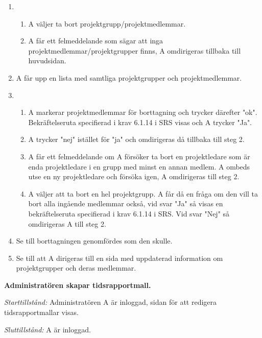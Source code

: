 \documentclass[a4paper]{article}
\begin{document}
\begin{ST}
\begin{enumerate}
\item 
\begin{enumerate}
\item A väljer ta bort projektgrupp/projektmedlemmar.
\item A får ett felmeddelande som sägar att inga projektmedlemmar/projektgrupper finns, A omdirigeras tillbaka till huvudsidan.
\end{enumerate}
\item A får upp en lista med samtliga projektgrupper och projektmedlemmar.
\item 
\begin{enumerate}
\item A markerar projektmedlemmar för borttagning och trycker därefter "ok". Bekräftelseruta specifierad i krav 6.1.14 i SRS visas och A trycker "Ja".
\item A trycker "nej" istället för "ja" och omdirigeras då tillbaka till steg 2.
\item A får ett felmeddelande om A försöker ta bort en projektledare som är enda projektledare i en grupp med minst en annan medlem. A ombeds utse en ny projektledare och försöka igen, A omdirigeras till steg 2.
\item A väljer att ta bort en hel projektgrupp. A får då en fråga om den vill ta bort alla ingående medlemmar också, vid svar "Ja" så visas en bekräftelseruta specifierad i krav 6.1.14 i SRS. Vid svar "Nej" så omdirigeras A till steg 2.
\end{enumerate}
\item Se till borttagningen genomfördes som den skulle.
\item Se till att A dirigeras till en sida med uppdaterad information om projektgrupper och deras medlemmar.
\end{enumerate}

\item
\textbf{Administratören skapar tidsrapportmall.}

\emph{Starttillstånd:} Administratören A är inloggad, sidan för att redigera tidsrapportmallar visas.

\emph{Sluttillstånd:} A är inloggad.


\end{ST}
\end{document}
